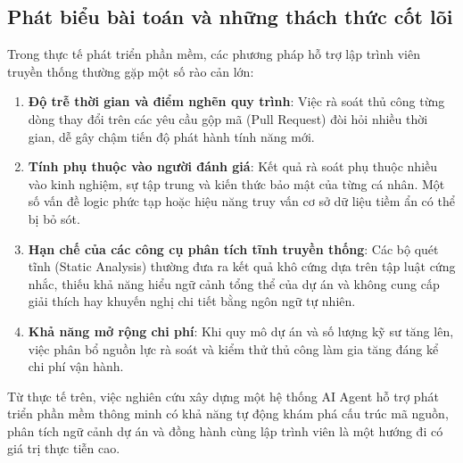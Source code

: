 \documentclass[12pt,a4paper]{report}
\begin{document}
\subsection{Phát biểu bài toán và những thách thức cốt lõi}
Trong thực tế phát triển phần mềm, các phương pháp hỗ trợ lập trình viên truyền thống thường gặp một số rào cản lớn:
\begin{enumerate}
    \item \textbf{Độ trễ thời gian và điểm nghẽn quy trình}: Việc rà soát thủ công từng dòng thay đổi trên các yêu cầu gộp mã (Pull Request) đòi hỏi nhiều thời gian, dễ gây chậm tiến độ phát hành tính năng mới.
    \item \textbf{Tính phụ thuộc vào người đánh giá}: Kết quả rà soát phụ thuộc nhiều vào kinh nghiệm, sự tập trung và kiến thức bảo mật của từng cá nhân. Một số vấn đề logic phức tạp hoặc hiệu năng truy vấn cơ sở dữ liệu tiềm ẩn có thể bị bỏ sót.
    \item \textbf{Hạn chế của các công cụ phân tích tĩnh truyền thống}: Các bộ quét tĩnh (Static Analysis) thường đưa ra kết quả khô cứng dựa trên tập luật cứng nhắc, thiếu khả năng hiểu ngữ cảnh tổng thể của dự án và không cung cấp giải thích hay khuyến nghị chi tiết bằng ngôn ngữ tự nhiên.
    \item \textbf{Khả năng mở rộng chi phí}: Khi quy mô dự án và số lượng kỹ sư tăng lên, việc phân bổ nguồn lực rà soát và kiểm thử thủ công làm gia tăng đáng kể chi phí vận hành.
\end{enumerate}

Từ thực tế trên, việc nghiên cứu xây dựng một hệ thống AI Agent hỗ trợ phát triển phần mềm thông minh có khả năng tự động khám phá cấu trúc mã nguồn, phân tích ngữ cảnh dự án và đồng hành cùng lập trình viên là một hướng đi có giá trị thực tiễn cao.
\end{document}
